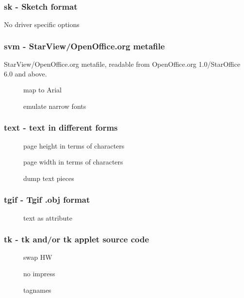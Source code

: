 \documentclass[english,a4paper]{article}
\begin{document}
\subsubsection{sk - Sketch format}
No driver specific options
\subsubsection{svm - StarView/OpenOffice.org metafile}
StarView/OpenOffice.org metafile, readable from OpenOffice.org 1.0/StarOffice 6.0 and above.

\begin{description}
\item[]
map to Arial


\item[]
emulate narrow fonts


\end{description}
\subsubsection{text - text in different forms }
\begin{description}
\item[]
page height in terms of characters


\item[]
page width in terms of characters


\item[]
dump text pieces


\end{description}
\subsubsection{tgif - Tgif .obj format}
\begin{description}
\item[]
text as attribute


\end{description}
\subsubsection{tk - tk and/or tk applet source code}
\begin{description}
\item[]
swap HW


\item[]
no impress


\item[]
tagnames


\end{description}
\end{document}
